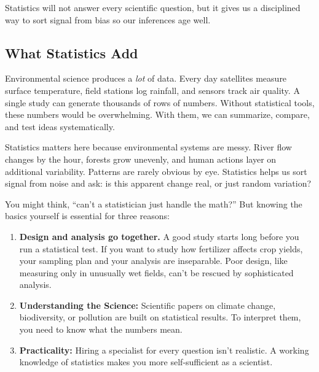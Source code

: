 \documentclass[
  letterpaper,
  DIV=11,
  numbers=noendperiod]{scrreprt}
\begin{document}
\begin{tcolorbox}[enhanced jigsaw, title=\textcolor{quarto-callout-note-color}{\faInfo}\hspace{0.5em}{Takeaway}, colframe=quarto-callout-note-color-frame, colbacktitle=quarto-callout-note-color!10!white, bottomtitle=1mm, leftrule=.75mm, rightrule=.15mm, titlerule=0mm, arc=.35mm, colback=white, opacitybacktitle=0.6, toprule=.15mm, toptitle=1mm, bottomrule=.15mm, coltitle=black, breakable, left=2mm, opacityback=0]

Statistics will not answer every scientific question, but it gives us a
disciplined way to sort signal from bias so our inferences age well.

\end{tcolorbox}

\subsection{What Statistics Add}\label{what-statistics-add}

Environmental science produces a \emph{lot} of data. Every day
satellites measure surface temperature, field stations log rainfall, and
sensors track air quality. A single study can generate thousands of rows
of numbers. Without statistical tools, these numbers would be
overwhelming. With them, we can summarize, compare, and test ideas
systematically.

Statistics matters here because environmental systems are messy. River
flow changes by the hour, forests grow unevenly, and human actions layer
on additional variability. Patterns are rarely obvious by eye.
Statistics helps us sort signal from noise and ask: is this apparent
change real, or just random variation?

You might think, ``can't a statistician just handle the math?'' But
knowing the basics yourself is essential for three reasons:

\begin{enumerate}
\def\labelenumi{\arabic{enumi}.}
\item
  \textbf{Design and analysis go together.} A good study starts long
  before you run a statistical test. If you want to study how fertilizer
  affects crop yields, your sampling plan and your analysis are
  inseparable. Poor design, like measuring only in unusually wet fields,
  can't be rescued by sophisticated analysis.
\item
  \textbf{Understanding the Science:} Scientific papers on climate
  change, biodiversity, or pollution are built on statistical results.
  To interpret them, you need to know what the numbers mean.
\item
  \textbf{Practicality:} Hiring a specialist for every question isn't
  realistic. A working knowledge of statistics makes you more
  self-sufficient as a scientist.
\end{enumerate}
\end{document}
